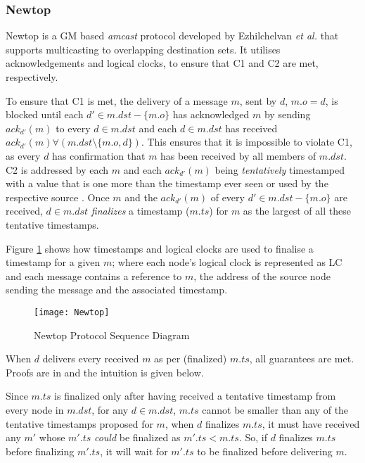         \subsubsection*{Newtop} \label{ssec:newtop}
        Newtop\citep{Ezhilchelvan:1995:NFG:876885.880005} is a GM based \emph{amcast} protocol developed by Ezhilchelvan \emph{et al.} that supports multicasting to overlapping destination sets.  It utilises acknowledgements and logical clocks, to ensure that C1 and C2 are met, respectively.  
        
        To ensure that C1 is met, the delivery of a message $m$, sent by $d$, $m.o=d$, is blocked until each $d' \in m.dst-\{m.o\}$ has acknowledged $m$ by sending $ack_{d'}(m)$ to every $d \in m.dst$ and each $d \in m.dst$ has received $ack_{d'}(m) \forall (m.dst \setminus \{m.o,d\})$.  This ensures that it is impossible to violate C1, as every $d$ has confirmation that $m$ has been received by all members of $m.dst$.
        C2 is addressed by each $m$ and each $ack_{d'}(m)$ being \emph{tentatively} timestamped with a value that is one more than the timestamp ever seen or used by the respective source \cite{Lamport:1978:TCO:359545.359563}. Once $m$ and the $ack_{d'}(m)$ of every $d'\in m.dst-\{m.o\}$ are received, $d \in m.dst$ \emph{finalizes} a timestamp ($m.ts$) for $m$ as the largest of all these tentative timestamps. 
        
        Figure \ref{fig:newtop} shows how timestamps and logical clocks are used to finalise a timestamp for a given $m$; where each node's logical clock is represented as LC and each message contains a reference to $m$, the address of the source node sending the message and the associated timestamp.  

    \begin{figure}[htbp!] 
                \centering    
                \texttt{[image: Newtop]}
                \caption[Newtop Atomic Multicast Protocol]{Newtop Protocol Sequence Diagram}
                \label{fig:newtop}
            \end{figure}	          
        
        When $d$ delivers every received $m$ as per (finalized) $m.ts$, all guarantees are met. Proofs are in \cite{Lamport:1978:TCO:359545.359563, Birman:1991:LCA:128738.128742, Ezhilchelvan:1995:NFG:876885.880005} and the intuition is given below.
        
        Since $m.ts$ is finalized only after having received a tentative timestamp from every node in $m.dst$, for any $d \in m.dst$, $m.ts$ cannot be smaller than any of the tentative timestamps proposed for $m$, when $d$ finalizes $m.ts$, it must have received any $m'$ whose $m'.ts$ \emph{could} be finalized as $m'.ts < m.ts$. So, if $d$ finalizes $m.ts$ before finalizing $m'.ts$, it will wait for $m'.ts$ to be finalized before delivering $m$.
        
